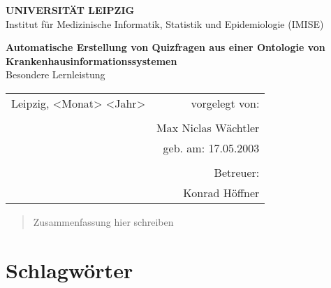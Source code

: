 \documentclass[headsepline,titlepage,twoside,12pt]{report}
\author{Max Niclas Wächtler}
\newcommand\todo[1]{}%
\begin{document}
\allowdisplaybreaks%

\onehalfspace

\begin{titlepage}
\thispagestyle{empty}
\begin{center}

{\large\bf UNIVERSITÄT LEIPZIG\\[1mm]}
Institut für Medizinische Informatik, Statistik und Epidemiologie (IMISE)

\vspace*{4cm}

{\Huge\textbf{Automatische Erstellung von Quizfragen aus einer Ontologie von Krankenhausinformationssystemen}\\}
\vspace{0.5cm}
{\large Besondere Lernleistung}\\
\vspace{2cm}
\todo{15--20 Seiten. Zwei Möglichkeiten:\\
(1) Vergleich, Zusammenfassung und \textbf{eigene} Bewertung zweier wissenschaftlicher Paper.\\
(2) Nutzenbewertung eines wissenschaftlichen Papers hinsichtlich einer konkreten Forschungssituation
}

\vspace*{4cm}

\begin{tabularx}{\textwidth}{lr}
Leipzig, <Monat> <Jahr>		&vorgelegt von:\\
\\
				&\makeatletter Max Niclas Wächtler \makeatother\\
				&geb. am: 17.05.2003\\
\\
				&Betreuer:\\
				&Konrad Höffner\\
\end{tabularx}
\vspace{1cm}

\end{center}
\end{titlepage}
\newpage
\begin{abstract}
Zusammenfassung hier schreiben
\end{abstract}
\tableofcontents
\newpage

\section*{Schlagwörter}
\todo{
Verschlagworten Sie Ihre Seminararbeit.
Mindestens 3 Schlagworte.
Wenn möglich nutzen Sie dazu Begriffe aus der SNIK-Ontologie, inbesondere bei Arbeiten aus dem Bereich Management von Informationssystemen.
Sie finden die URLs über die Suche auf SNIK Graph unter \url{http://www.snik.eu/graph}.
Achten Sie auch in der Seminararbeit auf die Verwendung dieser Schlagworte.
Eine Anleitung dazu finden Sie in der Auftaktveranstaltung.
}
\end{document}

